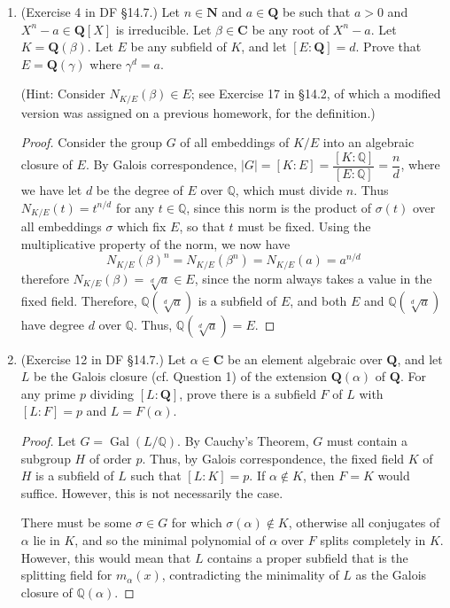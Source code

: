 \documentclass[10pt]{article}
\newcommand{\Q}{\mathbb{Q}}
\DeclareMathOperator*{\Gal}{Gal}
\begin{document}
\begin{enumerate}
\item (Exercise 4 in DF \S 14.7.) Let $n \in \mathbf{N}$ and $a \in \mathbf{Q}$ be such that $a>0$ and $X^n-a \in \mathbf{Q}[X]$ is irreducible.  Let $\beta \in \mathbf{C}$ be any root of $X^n-a$.  Let $K = \mathbf{Q}(\beta)$.  Let $E$ be any subfield of $K$, and let $[E:\mathbf{Q}]=d$.  Prove that $E = \mathbf{Q}(\gamma)$ where $\gamma^d=a$.

(Hint: Consider $N_{K/E}(\beta) \in E$; see Exercise 17 in \S 14.2, of which a modified version was assigned on a previous homework, for the definition.)

\begin{proof}
Consider the group $G$ of all embeddings of $K/E$ into an algebraic closure of $E$.  By Galois correspondence, $|G| = [K:E] = \dfrac{[K:\Q]}{[E:\Q]} = \dfrac{n}{d}$, where we have let $d$ be the degree of $E$ over $\Q$, which must divide $n$.  Thus $N_{K/E}(t) = t^{n/d}$ for any $t \in \Q$, since this norm is the product of $\sigma(t)$ over all embeddings $\sigma$ which fix $E$, so that $t$ must be fixed.  Using the multiplicative property of the norm, we now have
$$
N_{K/E}(\beta)^n = N_{K/E}(\beta^n) = N_{K/E}(a) = a^{n/d}
$$
therefore $N_{K/E}(\beta) = \sqrt[d]{a} \in E$, since the norm always takes a value in the fixed field.  Therefore, $\Q(\sqrt[d]{a})$ is a subfield of $E$, and both $E$ and $\Q(\sqrt[d]{a})$ have degree $d$ over $\Q$.  Thus, $\Q(\sqrt[d]{a}) = E$.
\end{proof}

\item (Exercise 12 in DF \S 14.7.) Let $\alpha \in \mathbf{C}$ be an element algebraic over $\mathbf{Q}$, and let $L$ be the Galois closure (cf. Question 1) of the extension $\mathbf{Q}(\alpha)$ of $\mathbf{Q}$.  For any prime $p$ dividing $[L:\mathbf{Q}]$, prove there is a subfield $F$ of $L$ with $[L:F]=p$ and $L=F(\alpha)$.

\begin{proof}

Let $G = \Gal(L/\Q)$.  By Cauchy's Theorem, $G$ must contain a subgroup $H$ of order $p$.  Thus, by Galois correspondence, the fixed field $K$ of $H$ is a subfield of $L$ such that $[L:K] = p$.  If $\alpha \not \in K$, then $F = K$ would suffice.  However, this is not necessarily the case.

There must be some $\sigma \in G$ for which $\sigma(\alpha) \not \in K$, otherwise all conjugates of $\alpha$ lie in $K$, and so the minimal polynomial of $\alpha$ over $F$ splits completely in $K$.  However, this would mean that $L$ contains a proper subfield that is the splitting field for $m_{\alpha}(x)$, contradicting the minimality of $L$ as the Galois closure of $\Q(\alpha)$.


\end{proof}
\end{enumerate}
\end{document}
